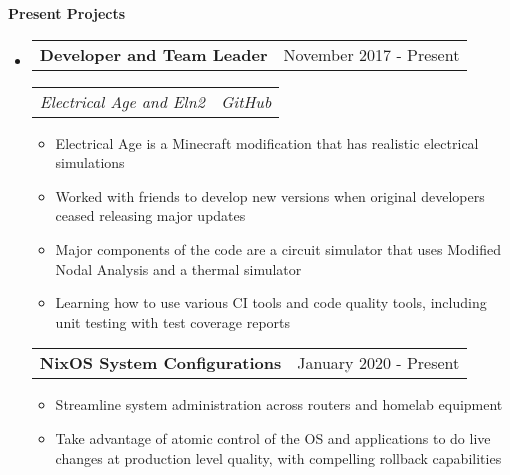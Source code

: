 \documentclass[letterpaper,12pt]{article}
\makeatletter
\newcommand{\resitem}[1]{\item #1 \vspace{-3pt}}
\newcommand{\resheading}[1]{{\large {\textbf{#1 \vphantom{p\^{E}}}}}\vspace{-3pt}}
\newcommand{\topheading}[2]{
\begin{tabular*}{6.5in}{l@{\extracolsep{\fill}}r}
		\textbf{#1} & #2 \\
\end{tabular*}}
\newcommand{\bottomheading}[2]{
\begin{tabular*}{6.5in}{l@{\extracolsep{\fill}}r}
		\textit{#1} & \textit{#2} \\
\end{tabular*}\vspace{-6pt}}
\newcommand{\singleheading}[2]{
\vspace{6pt}
\begin{tabular*}{6.5in}{l@{\extracolsep{\fill}}r}
		\textbf{#1} & #2 \\
\end{tabular*}
\vspace{-3pt}
}
\makeatother
\begin{document}
\resheading{Present Projects}
\begin{itemize}
	\item[]

	\topheading{Developer and Team Leader}{November 2017 - Present}
	\bottomheading{Electrical Age and Eln2}{GitHub}
	\begin{itemize}
		\resitem{Electrical Age is a Minecraft modification that has realistic electrical simulations}
		\resitem{Worked with friends to develop new versions when original developers ceased releasing major updates}
		\resitem{Major components of the code are a circuit simulator that uses Modified Nodal Analysis and a thermal simulator}
		\resitem{Learning how to use various CI tools and code quality tools, including unit testing with test coverage reports}
	\end{itemize}

	\singleheading{NixOS System Configurations}{January 2020 - Present}
	\begin{itemize}
		\resitem{Streamline system administration across routers and homelab equipment}
		\resitem{Take advantage of atomic control of the OS and applications to do live changes at production level quality, with compelling rollback capabilities}
	\end{itemize}

\end{itemize}


\newpage
\end{document}
